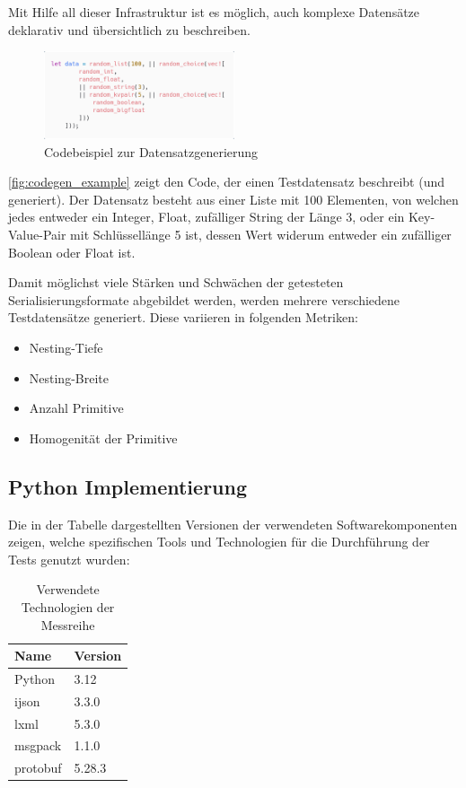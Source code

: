 \documentclass[ngerman]{seminarvorlage}
\begin{document}
Mit Hilfe all dieser Infrastruktur ist es möglich, auch komplexe Datensätze deklarativ und übersichtlich zu beschreiben.

\begin{figure}[h]
    \centering
    \includegraphics[width=0.5\textwidth]{images/codegen_code.png}
    \caption{Codebeispiel zur Datensatzgenerierung}
    \label{fig:codegen_example}
\end{figure}

\autoref{fig:codegen_example} zeigt den Code, der einen Testdatensatz beschreibt (und generiert). Der Datensatz besteht aus einer Liste mit 100 Elementen, von welchen jedes entweder ein Integer, Float, zufälliger String der Länge 3, oder ein Key-Value-Pair mit Schlüssellänge 5 ist, dessen Wert widerum entweder ein zufälliger Boolean oder Float ist.

Damit möglichst viele Stärken und Schwächen der getesteten Serialisierungsformate abgebildet werden, werden mehrere verschiedene Testdatensätze generiert. Diese variieren in folgenden Metriken:

\begin{itemize}
  \item Nesting-Tiefe
  \item Nesting-Breite
  \item Anzahl Primitive
  \item Homogenität der Primitive
\end{itemize}

\subsection{Python Implementierung}

Die in der Tabelle dargestellten Versionen der verwendeten Softwarekomponenten zeigen, welche spezifischen Tools und Technologien für die Durchführung der Tests genutzt wurden:

\begin{table}[H]
    \centering
    \begin{tabular}{|l|l|}
    \hline
    \textbf{Name} & \textbf{Version} \\ \hline
    Python        & 3.12             \\ \hline
    ijson         & 3.3.0            \\ \hline
    lxml          & 5.3.0            \\ \hline
    msgpack       & 1.1.0            \\ \hline
    protobuf      & 5.28.3           \\ \hline
    \end{tabular}
    \caption{Verwendete Technologien der Messreihe}
\end{table}
\end{document}
